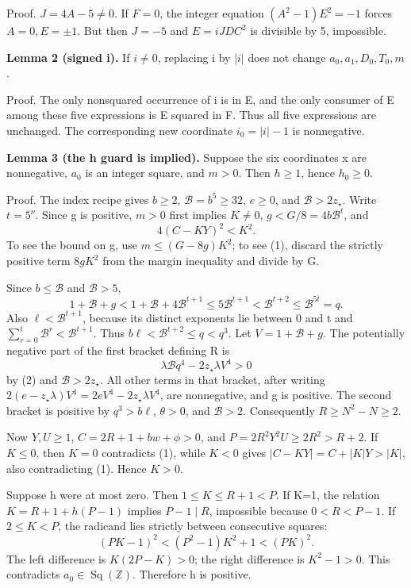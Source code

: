 Proof. \(J=4A-5\ne0\). If \(F=0\), the integer equation
\((A^2-1)E^2=-1\) forces \(A=0,E=\pm1\). But then \(J=-5\) and
\(E=iJDC^2\) is divisible by 5, impossible.

\textbf{Lemma 2 (signed i).} If \(i\ne0\), replacing i by \(|i|\) does
not change \(a_0,a_1,D_0,T_0,m\).

Proof. The only nonsquared occurrence of i is in E, and the only
consumer of E among these five expressions is E squared in F. Thus all
five expressions are unchanged. The corresponding new coordinate
\(i_0=|i|-1\) is nonnegative.

\textbf{Lemma 3 (the h guard is implied).} Suppose the six coordinates x
are nonnegative, \(a_0\) is an integer square, and \(m>0\). Then
\(h\ge1\), hence \(h_0\ge0\).

Proof. The index recipe gives \(b\ge2\), \(\mathcal B=b^5\ge32\),
\(e\ge0\), and \(\mathcal B>2z_\star\). Write \(t=5^\nu\). Since g is
positive, \(m>0\) first implies \(K\ne0\), \(g<G/8=4b\mathcal B^t\), and
\[
 4(C-KY)^2<K^2.
 \tag{1}
\] To see the bound on g, use \(m\le (G-8g)K^2\); to see (1), discard
the strictly positive term \(8gK^2\) from the margin inequality and
divide by G.

Since \(b\le\mathcal B\) and \(\mathcal B>5\), \[
 1+\mathcal B+g
 <1+\mathcal B+4\mathcal B^{t+1}
 \le5\mathcal B^{t+1}
 <\mathcal B^{t+2}\le\mathcal B^{5t}=q.
 \tag{2}
\] Also \(\ell<\mathcal B^{t+1}\), because its distinct exponents lie
between 0 and t and \(\sum_{r=0}^t\mathcal B^r<\mathcal B^{t+1}\). Thus
\(b\ell<\mathcal B^{t+2}\le q<q^3\). Let \(V=1+\mathcal B+g\). The
potentially negative part of the first bracket defining R is \[
 \lambda\mathcal Bq^4-2z_\star\lambda V^4>0
\] by (2) and \(\mathcal B>2z_\star\). All other terms in that bracket,
after writing \(2(e-z_\star\lambda)V^4=2eV^4-2z_\star\lambda V^4\), are
nonnegative, and g is positive. The second bracket is positive by
\(q^3>b\ell\), \(\theta>0\), and \(\mathcal B>2\). Consequently
\(R\ge N^2-N\ge2\).

Now \(Y,U\ge1\), \(C=2R+1+bw+\phi>0\), and \(P=2R^2Y^2U\ge2R^2>R+2\). If
\(K\le0\), then \(K=0\) contradicts (1), while \(K<0\) gives
\(|C-KY|=C+|K|Y>|K|\), also contradicting (1). Hence \(K>0\).

Suppose h were at most zero. Then \(1\le K\le R+1<P\). If K=1, the
relation \(K=R+1+h(P-1)\) implies \(P-1\mid R\), impossible because
\(0<R<P-1\). If \(2\le K<P\), the radicand lies strictly between
consecutive squares: \[
 (PK-1)^2<(P^2-1)K^2+1<(PK)^2.
\] The left difference is \(K(2P-K)>0\); the right difference is
\(K^2-1>0\). This contradicts \(a_0\in\operatorname{Sq}(\mathbb Z)\).
Therefore h is positive.

